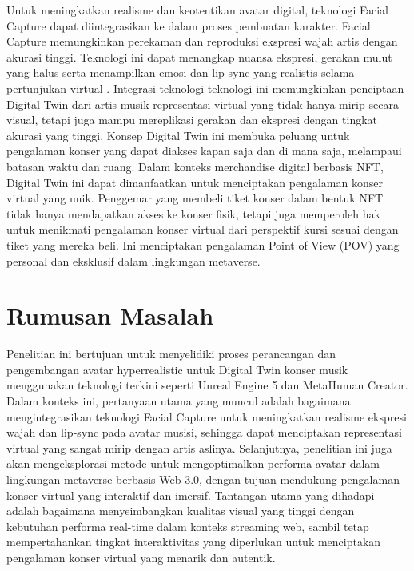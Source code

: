 Untuk meningkatkan realisme dan keotentikan avatar digital, teknologi Facial Capture dapat diintegrasikan ke dalam
proses pembuatan karakter. Facial Capture memungkinkan perekaman dan reproduksi ekspresi wajah artis dengan akurasi
tinggi. Teknologi ini dapat menangkap nuansa ekspresi, gerakan mulut yang halus serta menampilkan emosi dan lip-sync
yang realistis selama pertunjukan virtual \parencite{Zeng2020}. Integrasi teknologi-teknologi ini memungkinkan penciptaan Digital
Twin dari artis musik \- representasi virtual yang tidak hanya mirip secara visual, tetapi juga mampu mereplikasi
gerakan dan ekspresi dengan tingkat akurasi yang tinggi. Konsep Digital Twin ini membuka peluang untuk pengalaman
konser yang dapat diakses kapan saja dan di mana saja, melampaui batasan waktu dan ruang. Dalam konteks merchandise digital
berbasis NFT, Digital Twin ini dapat dimanfaatkan untuk menciptakan pengalaman konser virtual yang unik. Penggemar yang
membeli tiket konser dalam bentuk NFT tidak hanya mendapatkan akses ke konser fisik, tetapi juga memperoleh hak untuk
menikmati pengalaman konser virtual dari perspektif kursi sesuai dengan tiket yang mereka beli. Ini menciptakan pengalaman
Point of View (POV) yang personal dan eksklusif dalam lingkungan metaverse.



\section{Rumusan Masalah}


Penelitian ini bertujuan untuk menyelidiki proses perancangan dan pengembangan avatar hyperrealistic untuk Digital
Twin konser musik menggunakan teknologi terkini seperti Unreal Engine 5 dan MetaHuman Creator. Dalam konteks ini,
pertanyaan utama yang muncul adalah bagaimana mengintegrasikan teknologi Facial Capture untuk meningkatkan realisme
ekspresi wajah dan lip-sync pada avatar musisi, sehingga dapat menciptakan representasi virtual yang sangat mirip
dengan artis aslinya. Selanjutnya, penelitian ini juga akan mengeksplorasi metode untuk mengoptimalkan performa avatar
dalam lingkungan metaverse berbasis Web 3.0, dengan tujuan mendukung pengalaman konser virtual yang interaktif dan imersif. 
Tantangan utama yang dihadapi adalah bagaimana menyeimbangkan kualitas visual yang tinggi dengan kebutuhan performa real-time 
dalam konteks streaming web, sambil tetap mempertahankan tingkat interaktivitas yang diperlukan untuk menciptakan pengalaman 
konser virtual yang menarik dan autentik.


